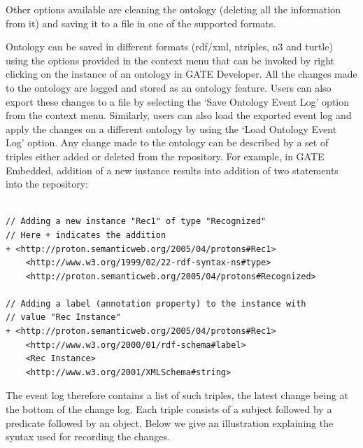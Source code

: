 {Other options available are cleaning the ontology (deleting all the information from
it) and saving it to a file in one of the supported formats.
 

Ontology can be saved in different formats (rdf/xml, ntriples, n3 and
turtle) using the options provided in the context menu that can be
invoked by right clicking on the instance of an ontology in GATE
Developer. All the changes made to the ontology are logged and stored
as an ontology feature. Users can also export these changes to a file
by selecting the `Save Ontology Event Log' option from the context
menu. Similarly, users can also load the exported event log and apply
the changes on a different ontology by using the `Load Ontology Event
Log' option. Any change made to the ontology can be described by a set
of triples either added or deleted from the repository. For example,
in GATE Embedded, addition of a new instance results into addition of
two statements into the repository:

\begin{small}\begin{verbatim}

// Adding a new instance "Rec1" of type "Recognized"
// Here + indicates the addition
+ <http://proton.semanticweb.org/2005/04/protons#Rec1> 
	<http://www.w3.org/1999/02/22-rdf-syntax-ns#type> 
	<http://proton.semanticweb.org/2005/04/protons#Recognized>

// Adding a label (annotation property) to the instance with 
// value "Rec Instance"
+ <http://proton.semanticweb.org/2005/04/protons#Rec1> 
	<http://www.w3.org/2000/01/rdf-schema#label> 
	<Rec Instance> 
	<http://www.w3.org/2001/XMLSchema#string>

\end{verbatim}\end{small}


The event log therefore contains a list of such triples, the latest change being at 
the bottom of the change log. Each triple consists of a subject followed by a 
predicate followed by an object.  Below we give an illustration explaining the 
syntax used for recording the changes.

\begin{small}\begin{verbatim}


\end{verbatim}
\end{small}}

